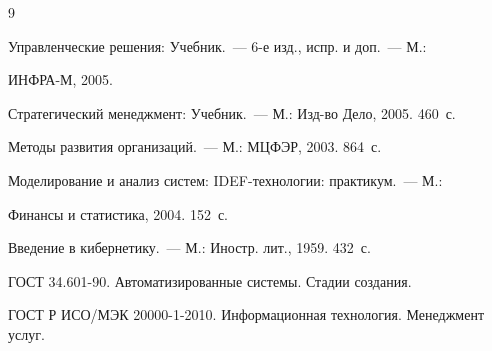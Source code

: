 {\small\frenchspacing


{%




\begin{thebibliography}{9}









Управленческие решения: Учебник.~--- 6-е изд., испр. и доп.~--- М.: 


ИНФРА-М, 2005. 









Стратегический менеджмент: Учебник.~--- М.: Изд-во Дело, 2005. 460~с. 









Методы развития организаций.~--- М.: МЦФЭР, 2003. 864~с.  











Моделирование и анализ систем: IDEF-тех\-но\-ло\-гии: практикум.~--- М.: 


Финансы и статистика, 2004.  152~с.












Введение в кибернетику.~--- М.: Иностр. лит., 1959.  432~с.







ГОСТ 34.601-90. Автоматизированные системы. Стадии создания.







ГОСТ Р ИСО/МЭК 20000-1-2010. Информационная технология. Менеджмент услуг.



\end{thebibliography}}}
